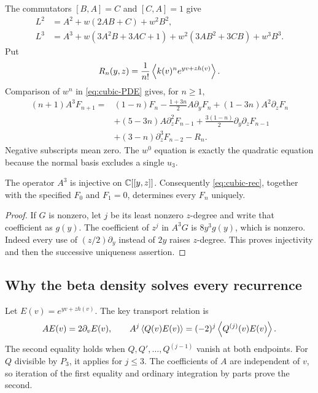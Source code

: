 The commutators $[B,A]=C$ and $[C,A]=1$ give
\begin{align*}
 L^2&=A^2+w(2AB+C)+w^2B^2,\\
 L^3&=A^3+w(3A^2B+3AC+1)
          +w^2(3AB^2+3CB)+w^3B^3.
\end{align*}
Put
\[
 R_n(y,z)=\frac1{n!}\left\langle k(v)^ne^{yv+zh(v)}\right\rangle.
\]
Comparison of $w^n$ in \eqref{eq:cubic-PDE} gives, for $n\ge1$,
\begin{equation}\label{eq:cubic-rec}
\begin{split}
 (n+1)A^3F_{n+1}={}&(1-n)F_n-\frac{1+3n}{2}A\partial_yF_n
 +(1-3n)A^2\partial_zF_n\\
 &+(5-3n)A\partial_z^2F_{n-1}
 +\frac{3(1-n)}2\partial_y\partial_zF_{n-1}\\
 &+(3-n)\partial_z^3F_{n-2}-R_n.
\end{split}
\end{equation}
Negative subscripts mean zero. The $w^0$ equation is exactly the
quadratic equation because the normal basis excludes a single $u_3$.

\begin{lemma}\label{lem:injective}
The operator $A^3$ is injective on $\mathbb C[[y,z]]$. Consequently
\eqref{eq:cubic-rec}, together with the specified $F_0$ and $F_1=0$,
determines every $F_n$ uniquely.
\end{lemma}
\begin{proof}
If $G$ is nonzero, let $j$ be its least nonzero $z$-degree and write that
coefficient as $g(y)$. The coefficient of $z^j$ in $A^3G$ is
$8y^3g(y)$, which is nonzero. Indeed every use of $(z/2)\partial_y$
instead of $2y$ raises $z$-degree. This proves injectivity and then the
successive uniqueness assertion.
\end{proof}

\subsection{Why the beta density solves every recurrence}
Let $E(v)=e^{yv+zh(v)}$. The key transport relation is
\begin{equation}\label{eq:transport}
 A E(v)=2\partial_v E(v),\qquad
 A^j\left\langle Q(v)E(v)\right\rangle=(-2)^j\left\langle Q^{(j)}(v)E(v)\right\rangle.
\end{equation}
The second equality holds when $Q,Q',\ldots,Q^{(j-1)}$ vanish at
both endpoints. For $Q$ divisible by $P_3$, it applies for $j\le3$.
The coefficients of $A$ are independent of $v$, so iteration of the
first equality and ordinary integration by parts prove the second.


